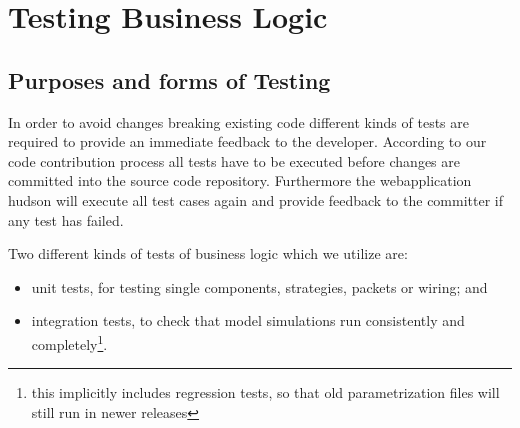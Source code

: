 \chapter{Testing Business Logic}
\label{chap:devguide-testing}

\section{Purposes and forms of Testing}
In order to avoid changes breaking existing code different kinds of tests are required to provide an immediate feedback to the developer. According to our code contribution process all tests have to be executed before changes are committed into the source code repository. Furthermore the webapplication hudson will execute all test cases again and provide feedback to the committer if any test has failed.

Two different kinds of tests of business logic which we utilize are:
\begin{itemize}\tightitemize{0pt}
	\item unit tests, for testing single components, strategies, packets or wiring; and
	\item integration tests, to check that model simulations run consistently and 
		completely\footnote{this implicitly includes regression tests, so that old 
		parametrization files will still run in newer \RA{} releases}.
\end{itemize}

